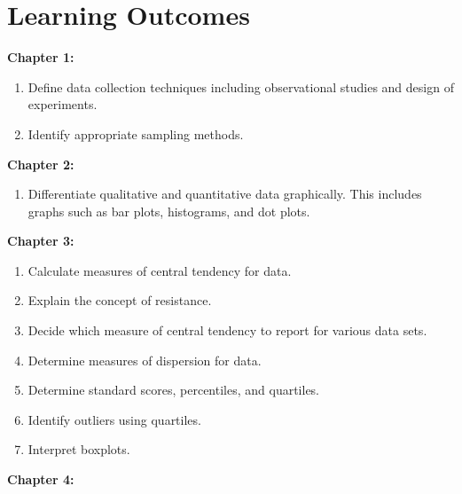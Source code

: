 \documentclass{report}
\begin{document}
    \section{Learning Outcomes}
    \bigbreak \noindent 
    \textbf{Chapter 1:}
    \begin{enumerate}
        \item Define data collection techniques including observational studies and design of experiments.
        \item Identify appropriate sampling methods.
    \end{enumerate}
    \bigbreak \noindent 
    \textbf{Chapter 2:}
    \begin{enumerate}
        \item Differentiate qualitative and quantitative data graphically.  This includes graphs such as bar plots, histograms, and dot plots.
    \end{enumerate}
    \bigbreak \noindent 
    \textbf{Chapter 3:}
    \begin{enumerate}
        \item Calculate measures of central tendency for data.
        \item Explain the concept of resistance.
        \item Decide which measure of central tendency to report for various data sets.
        \item Determine measures of dispersion for data.
        \item Determine standard scores, percentiles, and quartiles.
        \item Identify outliers using quartiles.
        \item Interpret boxplots.
    \end{enumerate}
    \bigbreak \noindent 
    \textbf{Chapter 4:}
\end{document}
